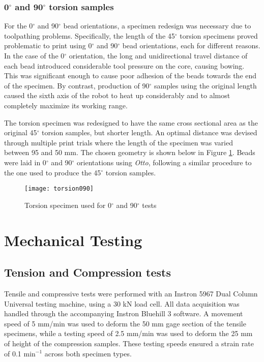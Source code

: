 \documentclass[main.tex]{subfiles}
\begin{document}
\subsubsection{0$^\circ$ and 90$^\circ$ torsion samples}
For the 0$^\circ$ and 90$^\circ$ bead orientations, a specimen redesign was necessary due to toolpathing problems. Specifically, the length of the 45$^\circ$ torsion specimens proved problematic to print using 0$^\circ$ and 90$^\circ$ bead orientations, each for different reasons. In the case of the 0$^\circ$ orientation, the long and unidirectional travel distance of each bead introduced considerable tool pressure on the core, causing bowing. This was significant enough to cause poor adhesion of the beads towards the end of the specimen. By contrast, production of 90$^\circ$ samples using the original length caused the sixth axis of the robot to heat up considerably and to almost completely maximize its working range. 

The torsion specimen was redesigned to have the same cross sectional area as the original 45$^\circ$ torsion samples, but shorter length. An optimal distance was devised through multiple print trials where the length of the specimen was varied between 95 and 50 mm. The chosen geometry is shown below in Figure \ref{fig:tors090}. Beads were laid in 0$^\circ$ and 90$^\circ$ orientations using \emph{Otto}, following a similar procedure to the one used to produce the 45$^\circ$ torsion samples.

\begin{figure}[h]
	\center
	\texttt{[image: torsion090]}
	\caption{Torsion specimen used for 0$^\circ$ and 90$^\circ$ tests} \label{fig:tors090}
\end{figure}

\section{Mechanical Testing}

\subsection{Tension and Compression tests}
Tensile and compressive tests were performed with an Instron 5967 Dual Column Universal testing machine, using a 30 kN load cell. All data acquisition was handled through the accompanying Instron Bluehill 3 software. A movement speed of 5 mm/min was used to deform the 50 mm gage section of the tensile specimens, while a testing speed of 2.5 mm/min was used to deform the 25 mm of height of the compression samples. These testing speeds ensured a strain rate of 0.1 min$^{-1}$ across both specimen types.
\end{document}

